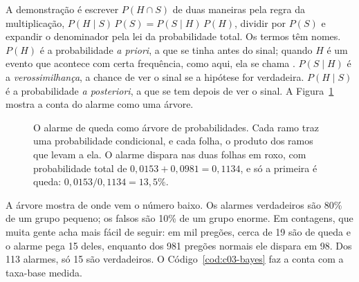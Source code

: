A demonstração é escrever $P(H \cap S)$ de duas maneiras pela regra da multiplicação, $P(H \mid S)\,P(S) = P(S \mid H)\,P(H)$, dividir por $P(S)$ e expandir o denominador pela lei da probabilidade total. Os termos têm nomes. $P(H)$ é a probabilidade \emph{a priori}, a que se tinha antes do sinal; quando $H$ é um evento que acontece com certa frequência, como aqui, ela se chama . $P(S \mid H)$ é a \emph{verossimilhança}, a chance de ver o sinal se a hipótese for verdadeira. $P(H \mid S)$ é a probabilidade \emph{a posteriori}, a que se tem depois de ver o sinal. A Figura~\ref{fig:c03-arvore} mostra a conta do alarme como uma árvore.

\begin{figure}[h]
\centering
{}
\caption{O alarme de queda como árvore de probabilidades. Cada ramo traz uma probabilidade condicional, e cada folha, o produto dos ramos que levam a ela. O alarme dispara nas duas folhas em roxo, com probabilidade total de $0,0153 + 0,0981 = 0,1134$, e só a primeira é queda: $0,0153/0,1134 = 13,5\%$.}
\label{fig:c03-arvore}
\end{figure}

A árvore mostra de onde vem o número baixo. Os alarmes verdadeiros são 80\% de um grupo pequeno; os falsos são 10\% de um grupo enorme. Em contagens, que muita gente acha mais fácil de seguir: em mil pregões, cerca de 19 são de queda e o alarme pega 15 deles, enquanto dos 981 pregões normais ele dispara em 98. Dos 113 alarmes, só 15 são verdadeiros. O Código~\ref{cod:c03-bayes} faz a conta com a taxa-base medida.

